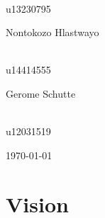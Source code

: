 \documentclass[a4paper,12pt]{article}
\begin{document}
\begin{titlepage}
\begin{center}
\begin{minipage}{0.4\textwidth}
\begin{flushleft}
\end{flushleft}
\end{minipage}
\begin{minipage}{0.4\textwidth}
\begin{flushright} \large
\emph{} \\
u13230795  
\end{flushright}
\end{minipage}
\begin{minipage}{0.4\textwidth}
\begin{flushleft} \large
Nontokozo Hlastwayo
\end{flushleft}
\end{minipage}
\begin{minipage}{0.4\textwidth}
\begin{flushright} \large
\emph{} \\
u14414555
\end{flushright}
\end{minipage}
\begin{minipage}{0.4\textwidth}
\begin{flushleft} \large
Gerome Schutte
\end{flushleft}
\end{minipage}
\begin{minipage}{0.4\textwidth}
\begin{flushright} \large
\emph{} \\
u12031519
\end{flushright}
\end{minipage}
\vfill

{\large \today}
\end{center}
\end{titlepage}
\footnotesize
\normalsize

%
%

\tableofcontents
\newpage

%
%
%

\section{Vision}
\end{document}

